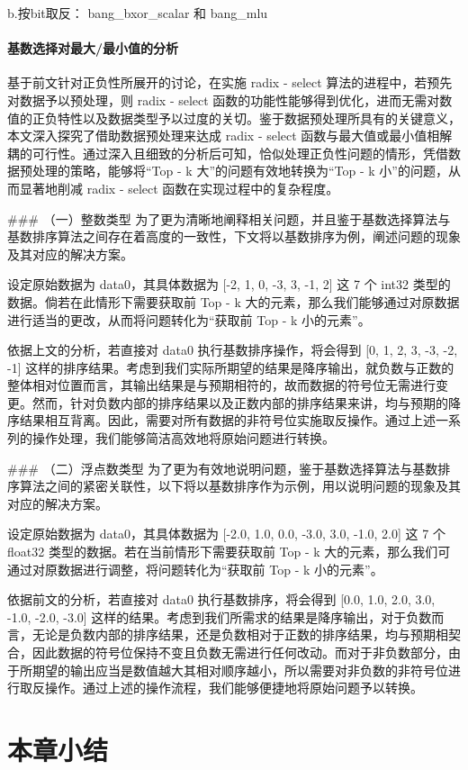 b.按bit取反： bang\_bxor\_scalar 和 bang\_mlu

\paragraph{基数选择对最大/最小值的分析}
基于前文针对正负性所展开的讨论，在实施 radix - select 算法的进程中，若预先对数据予以预处理，则 radix - select 函数的功能性能够得到优化，进而无需对数值的正负特性以及数据类型予以过度的关切。鉴于数据预处理所具有的关键意义，本文深入探究了借助数据预处理来达成 radix - select 函数与最大值或最小值相解耦的可行性。通过深入且细致的分析后可知，恰似处理正负性问题的情形，凭借数据预处理的策略，能够将“Top - k 大”的问题有效地转换为“Top - k 小”的问题，从而显著地削减 radix - select 函数在实现过程中的复杂程度。

### （一）整数类型
为了更为清晰地阐释相关问题，并且鉴于基数选择算法与基数排序算法之间存在着高度的一致性，下文将以基数排序为例，阐述问题的现象及其对应的解决方案。

设定原始数据为 data0，其具体数据为 [-2, 1, 0, -3, 3, -1, 2] 这 7 个 int32 类型的数据。倘若在此情形下需要获取前 Top - k 大的元素，那么我们能够通过对原数据进行适当的更改，从而将问题转化为“获取前 Top - k 小的元素”。

依据上文的分析，若直接对 data0 执行基数排序操作，将会得到 [0, 1, 2, 3, -3, -2, -1] 这样的排序结果。考虑到我们实际所期望的结果是降序输出，就负数与正数的整体相对位置而言，其输出结果是与预期相符的，故而数据的符号位无需进行变更。然而，针对负数内部的排序结果以及正数内部的排序结果来讲，均与预期的降序结果相互背离。因此，需要对所有数据的非符号位实施取反操作。通过上述一系列的操作处理，我们能够简洁高效地将原始问题进行转换。

### （二）浮点数类型
为了更为有效地说明问题，鉴于基数选择算法与基数排序算法之间的紧密关联性，以下将以基数排序作为示例，用以说明问题的现象及其对应的解决方案。

设定原始数据为 data0，其具体数据为 [-2.0, 1.0, 0.0, -3.0, 3.0, -1.0, 2.0] 这 7 个 float32 类型的数据。若在当前情形下需要获取前 Top - k 大的元素，那么我们可通过对原数据进行调整，将问题转化为“获取前 Top - k 小的元素”。

依据前文的分析，若直接对 data0 执行基数排序，将会得到 [0.0, 1.0, 2.0, 3.0, -1.0, -2.0, -3.0] 这样的结果。考虑到我们所需求的结果是降序输出，对于负数而言，无论是负数内部的排序结果，还是负数相对于正数的排序结果，均与预期相契合，因此数据的符号位保持不变且负数无需进行任何改动。而对于非负数部分，由于所期望的输出应当是数值越大其相对顺序越小，所以需要对非负数的非符号位进行取反操作。通过上述的操作流程，我们能够便捷地将原始问题予以转换。 













\section{本章小结}
